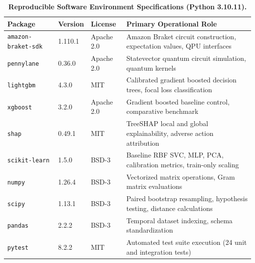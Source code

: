 \documentclass[10pt,a4paper]{article}
\begin{document}
\vspace{-2pt}
\begin{table}[h!]
\centering
\scriptsize
\renewcommand{\arraystretch}{0.74}
\caption{\textbf{Reproducible Software Environment Specifications (Python 3.10.11).}}
\label{tab:env}
\vspace{1pt}
\begin{tabularx}{\linewidth}{@{}lllX@{}}
\toprule
\textbf{Package} & \textbf{Version} & \textbf{License} & \textbf{Primary Operational Role} \\
\midrule
\texttt{amazon-braket-sdk} & 1.110.1 & Apache 2.0 & Amazon Braket circuit construction, expectation values, QPU interfaces \\
\texttt{pennylane} & 0.36.0 & Apache 2.0 & Statevector quantum circuit simulation, quantum kernels \\
\texttt{lightgbm} & 4.3.0 & MIT & Calibrated gradient boosted decision trees, focal loss classification \\
\texttt{xgboost} & 3.2.0 & Apache 2.0 & Gradient boosted baseline control, comparative benchmark \\
\texttt{shap} & 0.49.1 & MIT & TreeSHAP local and global explainability, adverse action attribution \\
\texttt{scikit-learn} & 1.5.0 & BSD-3 & Baseline RBF SVC, MLP, PCA, calibration metrics, train-only scaling \\
\texttt{numpy} & 1.26.4 & BSD-3 & Vectorized matrix operations, Gram matrix evaluations \\
\texttt{scipy} & 1.13.1 & BSD-3 & Paired bootstrap resampling, hypothesis testing, distance calculations \\
\texttt{pandas} & 2.2.2 & BSD-3 & Temporal dataset indexing, schema standardization \\
\texttt{pytest} & 8.2.2 & MIT & Automated test suite execution (24 unit and integration tests) \\
\bottomrule
\end{tabularx}
\end{table}
\vspace{-5pt}
\end{document}
